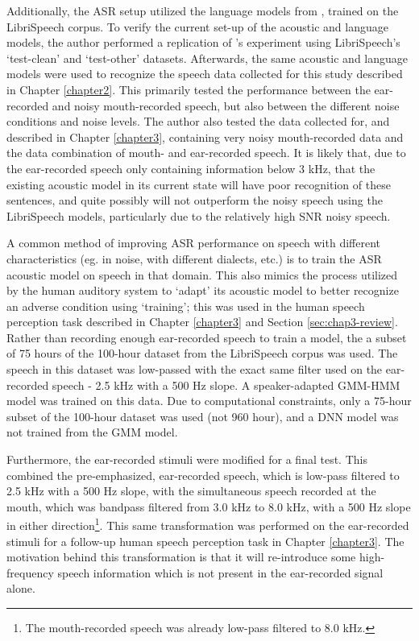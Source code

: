 Additionally, the ASR setup utilized the language models from \cite{panayotov:15}, trained on the LibriSpeech corpus.  To verify the current set-up of the acoustic and language models, the author performed a replication of \cite{panayotov:15}'s experiment using LibriSpeech's `test-clean' and `test-other' datasets.  Afterwards, the same acoustic and language models were used to recognize the speech data collected for this study described in Chapter \ref{chapter2}. This primarily tested the performance between the ear-recorded and noisy mouth-recorded speech, but also between the different noise conditions and noise levels.  The author also tested the data collected for, and described in Chapter \ref{chapter3}, containing very noisy mouth-recorded data and the data combination of mouth- and ear-recorded speech.
It is likely that, due to the ear-recorded speech only containing information below 3 kHz, that the existing acoustic model in its current state will have poor recognition of these sentences, and quite possibly will not outperform the noisy speech using the LibriSpeech models, particularly due to the relatively high SNR noisy speech.

A common method of improving ASR performance on speech with different characteristics (eg. in noise, with different dialects, etc.) is to train the ASR acoustic model on speech in that domain.  This also mimics the process utilized by the human auditory system to `adapt' its acoustic model to better recognize an adverse condition using `training'; this was used in the human speech perception task described in Chapter \ref{chapter3} and Section \ref{sec:chap3-review}.  Rather than recording enough ear-recorded speech to train a model, the a subset of 75 hours of the 100-hour dataset from the LibriSpeech corpus was used.  The speech in this dataset was low-passed with the exact same filter used on the ear-recorded speech - 2.5 kHz with a 500 Hz slope.  A speaker-adapted GMM-HMM model was trained on this data.  Due to computational constraints, only a 75-hour subset of the 100-hour dataset was used (not 960 hour), and a DNN model was not trained from the GMM model.

Furthermore, the ear-recorded stimuli were modified for a final test.  This combined the pre-emphasized, ear-recorded speech, which is low-pass filtered to 2.5 kHz with a 500 Hz slope, with the simultaneous speech recorded at the mouth, which was bandpass filtered from 3.0 kHz to 8.0 kHz, with a 500 Hz slope in either direction\footnote{The mouth-recorded speech was already low-pass filtered to 8.0 kHz.}. This same transformation was performed on the ear-recorded stimuli for a follow-up human speech perception task in Chapter \ref{chapter3}.  The motivation behind this transformation is that it will re-introduce some high-frequency speech information which is not present in the ear-recorded signal alone.

